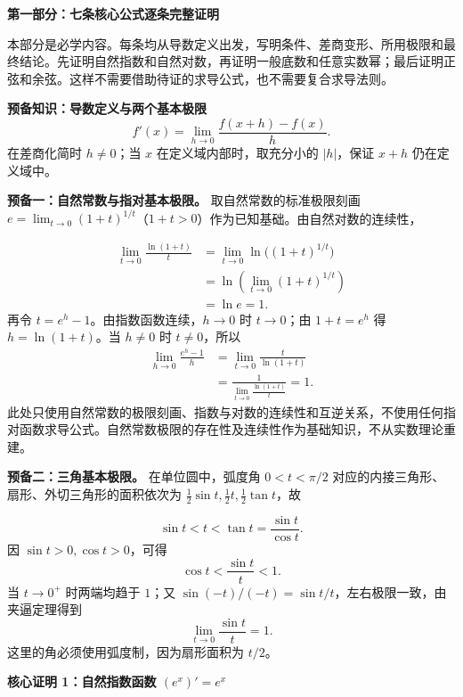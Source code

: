 \begin{proofbox}
\textbf{\textcolor{CProof}{第一部分：七条核心公式逐条完整证明}}

本部分是必学内容。每条均从导数定义出发，写明条件、差商变形、所用极限和最终结论。先证明自然指数和自然对数，再证明一般底数和任意实数幂；最后证明正弦和余弦。这样不需要借助待证的求导公式，也不需要复合求导法则。

\medskip
\textbf{\textcolor{CProof}{预备知识：导数定义与两个基本极限}}
\[
f'(x)=\lim_{h\to0}\frac{f(x+h)-f(x)}h.
\]
在差商化简时 $h\ne0$；当 $x$ 在定义域内部时，取充分小的 $|h|$，保证 $x+h$ 仍在定义域中。

\textbf{预备一：自然常数与指对基本极限。} 取自然常数的标准极限刻画 $e=\lim_{t\to0}(1+t)^{1/t}$（$1+t>0$）作为已知基础。由自然对数的连续性，




\[
\begin{aligned}
\lim_{t\to0}\frac{\ln(1+t)}t
&=\lim_{t\to0}\ln\big((1+t)^{1/t}\big)\\
&=\ln\left(\lim_{t\to0}(1+t)^{1/t}\right)\\
&=\ln e=1.
\end{aligned}
\]
再令 $t=e^h-1$。由指数函数连续，$h\to0$ 时 $t\to0$；由 $1+t=e^h$ 得 $h=\ln(1+t)$。当 $h\ne0$ 时 $t\ne0$，所以
\[
\begin{aligned}
\lim_{h\to0}\frac{e^h-1}{h}
&=\lim_{t\to0}\frac{t}{\ln(1+t)}\\
&=\frac{1}{\lim_{t\to0}\frac{\ln(1+t)}t}=1.
\end{aligned}
\]
此处只使用自然常数的极限刻画、指数与对数的连续性和互逆关系，不使用任何指对函数求导公式。自然常数极限的存在性及连续性作为基础知识，不从实数理论重建。

\textbf{预备二：三角基本极限。} 在单位圆中，弧度角 $0<t<\pi/2$ 对应的内接三角形、扇形、外切三角形的面积依次为 $\frac12\sin t,\frac12t,\frac12\tan t$，故


\[
\sin t<t<\tan t=\frac{\sin t}{\cos t}.
\]
因 $\sin t>0,\cos t>0$，可得
\[
\cos t<\frac{\sin t}{t}<1.
\]
当 $t\to0^+$ 时两端均趋于 $1$；又 $\sin(-t)/(-t)=\sin t/t$，左右极限一致，由夹逼定理得到
\[
\boxed{\lim_{t\to0}\frac{\sin t}{t}=1}.
\]
这里的角必须使用弧度制，因为扇形面积为 $t/2$。

\medskip
\begin{minipage}{\linewidth}
\textbf{\textcolor{CProof}{核心证明 1：自然指数函数 $(e^x)'=e^x$}}



\end{minipage}
\end{proofbox}

